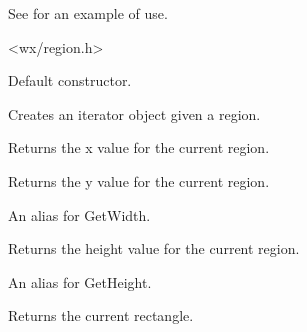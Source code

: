 See  for an example of use.




<wx/region.h>





\label{wxregioniteratorctor}


Default constructor.


Creates an iterator object given a region.


\label{wxregioniteratorgetx}


Returns the x value for the current region.


\label{wxregioniteratorgety}


Returns the y value for the current region.


\label{wxregioniteratorgetw}


An alias for GetWidth.


\label{wxregioniteratorgetheight}


Returns the height value for the current region.


\label{wxregioniteratorgeth}


An alias for GetHeight.


\label{wxregioniteratorgetrect}


Returns the current rectangle.


